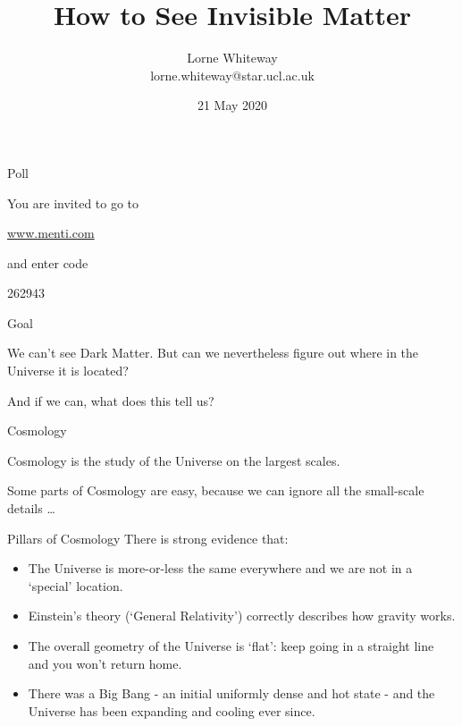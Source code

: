 \documentclass[usenames,dvipsnames]{beamer}
\title{How to See Invisible Matter}
\author{Lorne Whiteway \\ lorne.whiteway@star.ucl.ac.uk}
\institute{Astrophysics Group \\ Department of Physics and Astronomy \\ University College London}
\date{21 May 2020}
\newcommand{\mentiurl}[0]{{\url{www.menti.com}}}
\newcommand{\menticode}[0]{{262943}}
\begin{document}
\frame{\titlepage}


\begin{frame}{Poll}
  \begin{block}{}
    You are invited to go to\\
    \begin{center}
    \huge \alert{\mentiurl{}}\\
    \end{center}
    and enter code\\
    \begin{center}
    \huge \menticode{}
    \end{center}
  \end{block}
\end{frame}

\begin{frame}{Goal}
  \begin{block}{}
    We can't see Dark Matter. But can we nevertheless figure out where in the Universe it is located?
  \end{block}
  \begin{block}{}
    And if we can, what does this tell us?
  \end{block}
\end{frame}

\begin{frame}{Cosmology}
  \begin{block}{}
    Cosmology is the study of the Universe on the largest scales.
  \end{block}
  \begin{block}{}
    Some parts of Cosmology are easy, because we can ignore all the small-scale details \ldots
  \end{block}
\end{frame}

\begin{frame}{Pillars of Cosmology}
  There is strong evidence that:
  \begin{block}{}
    \begin{itemize}
      \item{The Universe is more-or-less the same everywhere and we are not in a `special' location.}
      \item{Einstein's theory (`General Relativity') correctly describes how gravity works.}
      \item{The overall geometry of the Universe is `flat': keep going in a straight line and you won't return home.}
      \item{There was a Big Bang - an initial uniformly dense and hot state - and the Universe has been expanding and cooling ever since.}
    \end{itemize}
  \end{block}
\end{frame}
\end{document}
